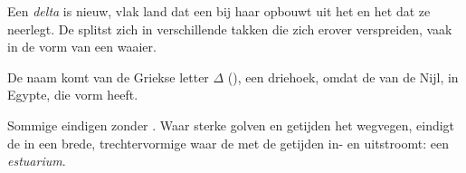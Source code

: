 \begin{definition}[Delta]\label{def:g5:water-shapes-the-land:delta}
Een \emph{delta} is nieuw, vlak land dat een  bij haar
 opbouwt uit het  en het  dat ze neerlegt. De  splitst
zich in verschillende takken die zich erover verspreiden, vaak in de vorm
van een waaier.
\end{definition}

De naam komt van de Griekse letter $\Delta$ (), een driehoek, omdat
de  van de Nijl, in Egypte, die vorm heeft.

Sommige  eindigen zonder . Waar sterke golven en getijden het
 wegvegen, eindigt de  in een brede, trechtervormige 
waar de  met de getijden in- en uitstroomt: een \emph{estuarium}.


